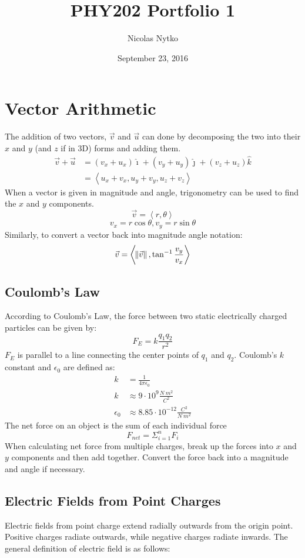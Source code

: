 \documentclass{article}
\title{PHY202 Portfolio 1}
\author{Nicolas Nytko}
\date{September 23, 2016}
\begin{document}
\maketitle
\newpage
\section{Vector Arithmetic}
The addition of two vectors, $\vec{v}$ and $\vec{u}$ can done by decomposing the two into their $x$ and $y$ (and $z$ if in 3D) forms and adding them.
\begin{align}
  \vec{v} + \vec{u} &= (v_x + u_x)\hat{\imath} + (v_y + u_y)\hat{\jmath} + (v_z + u_z)\hat{k} \\
  &= \left\langle u_x + v_x, u_y + v_y, u_z + v_z \right\rangle
\end{align}
When a vector is given in magnitude and angle, trigonometry can be used to find the $x$ and $y$ components.
\[\vec{v} = \left\langle r, \theta \right\rangle\]
\[v_x = r\cos\theta, v_y = r\sin\theta\]
Similarly, to convert a vector back into magnitude angle notation:
\[ \vec{v} = \left\langle \norm{\vec{v}}, \tan^{-1}\frac{v_y}{v_x} \right\rangle \]
\subsection{Coulomb's Law}
According to Coulomb's Law, the force between two static electrically charged particles can be given by:
\[ F_E = k\frac{q_1q_2}{r^2} \]
$F_E$ is parallel to a line connecting the center points of $q_1$ and $q_2$. Coulomb's $k$ constant and $\epsilon_0$ are defined as:
\begin{align}
  k &= \frac{1}{4\pi\epsilon_0} \\
  k &\approx 9 \cdot 10^9 \frac{N \ m^2}{C^2} \\
  \epsilon_0 &\approx 8.85 \cdot 10^{-12} \frac{C^2}{N \ m^2}
\end{align}
The net force on an object is the sum of each individual force
\[F_{net} = \Sigma_{i=1}^n F_i\]
When calculating net force from multiple charges, break up the forces into $x$ and $y$ components and then add together.  Convert the force back into a magnitude and angle if necessary.
\subsection{Electric Fields from Point Charges}
Electric fields from point charge extend radially outwards from the origin point.  Positive charges radiate outwards, while negative charges radiate inwards.  The general definition of electric field is as follows:
\end{document}
